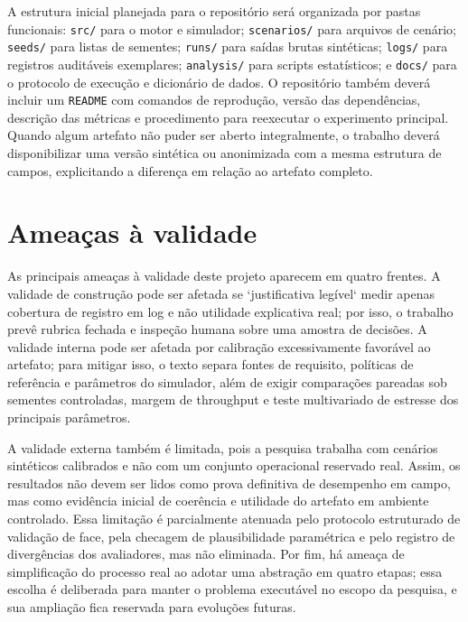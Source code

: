 \documentclass[
  12pt,
  oneside,
  a4paper,
  sumario=tradicional,
  brazil
]{abntex2}
\begin{document}
A estrutura inicial planejada para o reposit\'orio ser\'a organizada por pastas funcionais: \texttt{src/} para o motor e simulador; \texttt{scenarios/} para arquivos de cen\'ario; \texttt{seeds/} para listas de sementes; \texttt{runs/} para sa\'idas brutas sint\'eticas; \texttt{logs/} para registros audit\'aveis exemplares; \texttt{analysis/} para scripts estat\'isticos; e \texttt{docs/} para o protocolo de execu\c{c}\~ao e dicion\'ario de dados. O reposit\'orio tamb\'em dever\'a incluir um \texttt{README} com comandos de reprodu\c{c}\~ao, vers\~ao das depend\^encias, descri\c{c}\~ao das m\'etricas e procedimento para reexecutar o experimento principal. Quando algum artefato n\~ao puder ser aberto integralmente, o trabalho dever\'a disponibilizar uma vers\~ao sint\'etica ou anonimizada com a mesma estrutura de campos, explicitando a diferen\c{c}a em rela\c{c}\~ao ao artefato completo.

\chapter{Ameaças à validade}
As principais amea\c{c}as \`a validade deste projeto aparecem em quatro frentes. A validade de constru\c{c}\~ao pode ser afetada se `justificativa leg\'ivel` medir apenas cobertura de registro em log e n\~ao utilidade explicativa real; por isso, o trabalho prev\^e rubrica fechada e inspe\c{c}\~ao humana sobre uma amostra de decis\~oes. A validade interna pode ser afetada por calibra\c{c}\~ao excessivamente favor\'avel ao artefato; para mitigar isso, o texto separa fontes de requisito, pol\'iticas de refer\^encia e par\^ametros do simulador, al\'em de exigir compara\c{c}\~oes pareadas sob sementes controladas, margem de throughput e teste multivariado de estresse dos principais par\^ametros.

A validade externa tamb\'em \'e limitada, pois a pesquisa trabalha com cen\'arios sint\'eticos calibrados e n\~ao com um conjunto operacional reservado real. Assim, os resultados n\~ao devem ser lidos como prova definitiva de desempenho em campo, mas como evid\^encia inicial de coer\^encia e utilidade do artefato em ambiente controlado. Essa limita\c{c}\~ao \'e parcialmente atenuada pelo protocolo estruturado de valida\c{c}\~ao de face, pela checagem de plausibilidade param\'etrica e pelo registro de diverg\^encias dos avaliadores, mas n\~ao eliminada. Por fim, h\'a amea\c{c}a de simplifica\c{c}\~ao do processo real ao adotar uma abstra\c{c}\~ao em quatro etapas; essa escolha \'e deliberada para manter o problema execut\'avel no escopo da pesquisa, e sua amplia\c{c}\~ao fica reservada para evolu\c{c}\~oes futuras.
\end{document}
